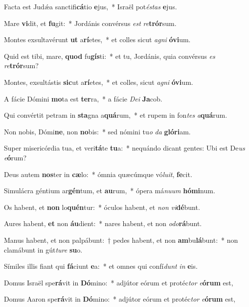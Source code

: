 \item Facta est Judǽa sanctifi\textbf{cá}tio \textbf{e}jus,~* Israël pot\textit{és}\textit{tas} \textbf{e}jus.
\item Mare \textbf{vi}dit, et \textbf{fu}git:~* Jordánis convérsus \textit{est} \textit{re}\textbf{trór}sum.
\item Montes exsultavérunt \textbf{ut} a\textbf{rí}etes,~* et colles sicut \textit{a}\textit{gni} \textbf{ó}\textbf{vi}um.
\item Quid est tibi, mare, \textbf{quod} fu\textbf{gís}ti:~* et tu, Jordánis, quia convérsus \textit{es} \textit{re}\textbf{trór}sum?
\item Montes, exsultástis \textbf{sic}ut a\textbf{rí}etes,~* et colles, sicut \textit{a}\textit{gni} \textbf{ó}\textbf{vi}um.
\item A fácie Dómini \textbf{mo}ta est \textbf{ter}ra,~* a fácie \textit{De}\textit{i} \textbf{Ja}cob.
\item Qui convértit petram in \textbf{sta}gna a\textbf{quá}rum,~* et rupem in fon\textit{tes} \textit{a}\textbf{quá}rum.
\item Non nobis, Dómi\textbf{ne}, non \textbf{no}bis:~* sed nómini tu\textit{o} \textit{da} \textbf{gló}\textbf{ri}am.
\item Super misericórdia tua, et veri\textbf{tá}te \textbf{tu}a:~* nequándo dicant gentes: Ubi est De\textit{us} \textit{e}\textbf{ó}rum?
\item Deus autem \textbf{nos}ter in \textbf{cæ}lo:~* ómnia quæcúmque vó\textit{lu}\textit{it}, \textbf{fe}cit.
\item Simulácra géntium ar\textbf{gén}tum, et \textbf{au}rum,~* ópera má\textit{nu}\textit{um} \textbf{hó}\textbf{mi}num.
\item Os habent, et \textbf{non} lo\textbf{quén}tur:~* óculos habent, et \textit{non} \textit{vi}\textbf{dé}bunt.
\item Aures habent, \textbf{et} non \textbf{áu}dient:~* nares habent, et non \textit{o}\textit{do}\textbf{rá}bunt.
\item Manus habent, et non palpábunt:~† pedes habent, et non \textbf{am}bu\textbf{lá}bunt:~* non clamábunt in gút\textit{tu}\textit{re} \textbf{su}o.
\item Símiles illis fiant qui \textbf{fá}ciunt \textbf{e}a:~* et omnes qui confí\textit{dunt} \textit{in} \textbf{e}is.
\item Domus Israël spe\textbf{rá}vit in \textbf{Dó}mino:~* adjútor eórum et protéc\textit{tor} \textit{e}\textbf{ó}\textbf{rum} est,
\item Domus Aaron spe\textbf{rá}vit in \textbf{Dó}mino:~* adjútor eórum et protéc\textit{tor} \textit{e}\textbf{ó}\textbf{rum} est,
